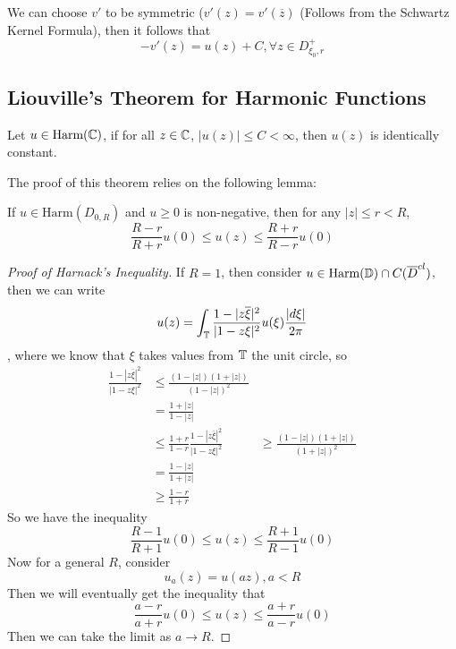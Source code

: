 \documentclass{article}
\begin{document}
We can choose $v'$ to be symmetric ($v'(z) = v'(\overline{z})$ (Follows from the Schwartz Kernel Formula), then it follows that
\[-v'(z) = u(z) + C, \forall z \in D_{\xi_0, r}^+\]

\subsection{Liouville's Theorem for Harmonic Functions}

\begin{theorem}
    Let $u \in \text{Harm}(\mathbb{C})$, if for all $z \in \mathbb{C}$, $|u(z)| \leq C < \infty$, then $u(z)$ is identically constant.
\end{theorem}

The proof of this theorem relies on the following lemma:

\begin{theorem}
    If $u \in \text{Harm}(D_{0, R})$ and $u \geq 0$ is non-negative, then for any $|z| \leq r < R$,
    \[\frac{R - r}{R + r} u(0) \leq u(z) \leq \frac{R + r}{R - r} u(0)\]
\end{theorem}

\begin{proof}[Proof of Harnack's Inequality]
    If $R = 1$, then consider $u \in \text{Harm}(\mathbb{D}) \cap C(\overline{D}^{cl})$, then we can write
    \[u(z) = \int_{\mathbb{T}} \frac{1 - |z \overline{\xi}|^2}{|1 - z \xi|^2} u(\xi) \frac{|d\xi|}{2\pi}\]
    , where we know that $\xi$ takes values from $\mathbb{T}$ the unit circle, so
    \begin{align*}
        \frac{1 - |z \overline{\xi}|^2}{|1 - z \xi|^2} &\leq \frac{(1 - |z|)(1 + |z|)}{(1 - |z|)^2}\\
        &= \frac{1 + |z|}{1 - |z|}\\
        &\leq \frac{1 + r}{1 - r} \tag*{Since $|z|$ is monotonic}
        \frac{1 - |z \overline{\xi}|^2}{|1 - z \xi|^2} &\geq \frac{(1 - |z|)(1 + |z|)}{(1 + |z|)^2}\\
        &= \frac{1 - |z|}{1 + |z|}\\
        &\geq \frac{1 - r}{1 + r} \tag*{Since $|z|$ is monotonic}
    \end{align*}
    So we have the inequality
    \[\frac{R - 1}{R + 1} u(0) \leq u(z) \leq \frac{R + 1}{R - 1} u(0)\]
    Now for a general $R$, consider
    \[u_a(z) = u(az), a < R\]
    Then we will eventually get the inequality that
    \[\frac{a - r}{a + r} u(0) \leq u(z) \leq \frac{a + r}{a - r} u(0)\]
    Then we can take the limit as $a \to R$.
\end{proof}
\end{document}
